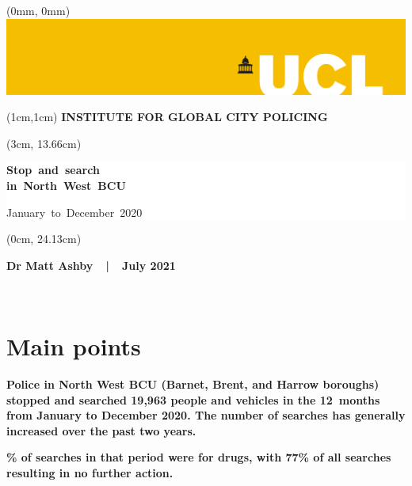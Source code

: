 \documentclass[
  a4paper,
  twoside, 11pt]{article}
\begin{document}
\begin{textblock*}{21cm}(0mm, 0mm)
\includegraphics[width=21cm]{ucl-banner-port-yellow-rgb-lg.png}
\end{textblock*}

\begin{textblock*}{21cm}(1cm,1cm)
\textbf{\sffamily INSTITUTE FOR GLOBAL CITY POLICING}
\end{textblock*}

\begin{textblock*}{18cm}(3cm, 13.66cm)
\raggedright \sffamily
\begin{singlespace}
\colorbox{white}{\hspace{1cm}\parbox[c][5.9cm]{16cm}{
{\fontsize{40}{32}\selectfont \bfseries 
\mbox{Stop and search}\\\mbox{in North West BCU}
\vspace{6pt}}

{\fontsize{36}{30}\selectfont \mbox{January to December 2020} }

}\hspace{1cm}}
\end{singlespace}
\end{textblock*}

\begin{textblock*}{11.43cm}(0cm, 24.13cm)
\colorbox{uclyellow}{\parbox[c][2.63cm]{\textwidth}{
\centering \bfseries \sffamily \fontsize{16}{16}\selectfont 
Dr Matt Ashby\ \ |\ \ July 2021
}}
\end{textblock*}

~

\thispagestyle{empty}
\newpage

\hypertarget{main-points}{%
\section{Main points}\label{main-points}}

\textbf{\sffamily Police in North West BCU (Barnet, Brent, and Harrow boroughs) stopped and searched 19,963 people and vehicles in the 12~months from January to December 2020. The number of searches has generally increased over the past two years.}

\textbf{\% of searches in that period were for drugs, with 77\% of all searches resulting in no further action.}
\end{document}
